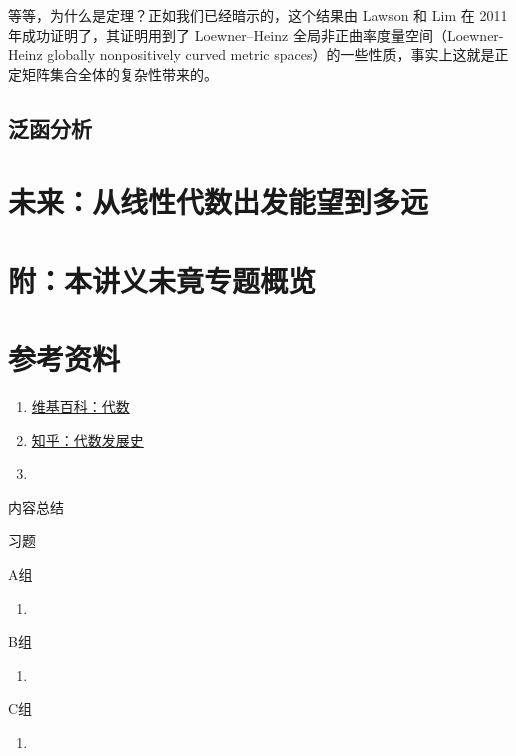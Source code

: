 等等，为什么是定理？正如我们已经暗示的，这个结果由 Lawson 和 Lim 在 2011 年成功证明了，其证明用到了 Loewner–Heinz 全局非正曲率度量空间（Loewner-Heinz globally nonpositively curved metric spaces）的一些性质，事实上这就是正定矩阵集合全体的复杂性带来的。


\subsection{泛函分析}


\section{未来：从线性代数出发能望到多远}


\section*{附：本讲义未竟专题概览}


\section*{参考资料}
\begin{enumerate}
    \item \href{https://zh.wikipedia.org/wiki/%E4%BB%A3%E6%95%B0}{维基百科：代数}
    \item \href{https://zhuanlan.zhihu.com/p/574858845}{知乎：代数发展史}
    \item 
\end{enumerate}
\vspace{2ex}
\centerline{\heiti \Large 内容总结}

\vspace{2ex}

\centerline{\heiti \Large 习题}
\vspace{2ex}
{\kaishu }
\begin{flushright}
    \kaishu

\end{flushright}
\centerline{\heiti A组}
\begin{enumerate}
    \item 
\end{enumerate}
\centerline{\heiti B组}
\begin{enumerate}
    \item
\end{enumerate}
\centerline{\heiti C组}
\begin{enumerate}
    \item
\end{enumerate}
